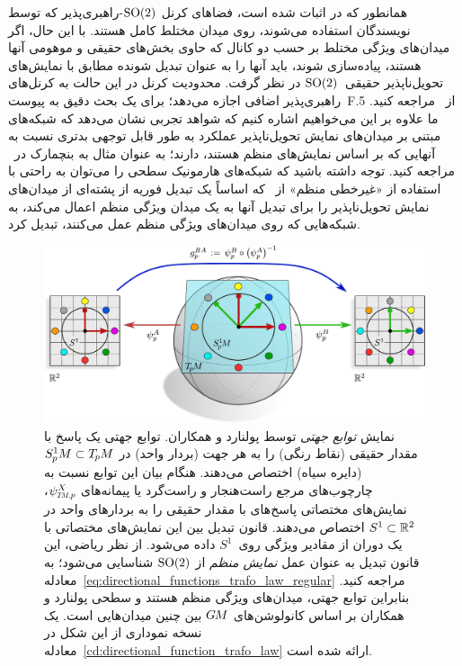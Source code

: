 همانطور که در \cite{lang2020WignerEckart,Weiler2019_E2CNN} اثبات شده است، فضاهای کرنل $\operatorname{SO}(2)$-راهبری‌پذیر که توسط نویسندگان استفاده می‌شوند، روی میدان مختلط کامل هستند.
با این حال، اگر میدان‌های ویژگی مختلط بر حسب دو کانال که حاوی بخش‌های حقیقی و موهومی آنها هستند، پیاده‌سازی شوند، باید آنها را به عنوان تبدیل شونده مطابق با نمایش‌های تحویل‌ناپذیر حقیقی~$\operatorname{SO}(2)$ در نظر گرفت.
محدودیت کرنل در این حالت به کرنل‌های راهبری‌پذیر اضافی اجازه می‌دهد؛ برای یک بحث دقیق به پیوست~F.5 از~\cite{Weiler2019_E2CNN} مراجعه کنید.
ما علاوه بر این می‌خواهیم اشاره کنیم که شواهد تجربی نشان می‌دهد که شبکه‌های مبتنی بر میدان‌های نمایش تحویل‌ناپذیر عملکرد به طور قابل توجهی بدتری نسبت به آنهایی که بر اساس نمایش‌های منظم هستند، دارند؛ به عنوان مثال به بنچمارک در~\cite{Weiler2019_E2CNN} مراجعه کنید.
توجه داشته باشید که شبکه‌های هارمونیک سطحی را می‌توان به راحتی با استفاده از «غیرخطی منظم» از~\cite{deHaan2020meshCNNs} که اساساً یک تبدیل فوریه از پشته‌ای از میدان‌های نمایش تحویل‌ناپذیر را برای تبدیل آنها به یک میدان ویژگی منظم اعمال می‌کند، به شبکه‌هایی که روی میدان‌های ویژگی منظم عمل می‌کنند، تبدیل کرد.


\begin{figure}
    \centering
    \includegraphics[width=1.\textwidth]{figures/directional_function.pdf}
    \caption{\small
        نمایش \emph{توابع جهتی} توسط پولنارد و همکاران\cite{poulenard2018multi}.
        توابع جهتی یک پاسخ با مقدار حقیقی (نقاط رنگی) را به هر جهت (بردار واحد) در $S^1_{\mkern-.5mu p}\mkern-.5muM \subset T_{\mkern-1.5mu p}\mkern-.5muM$ (دایره سیاه) اختصاص می‌دهند.
        هنگام بیان این توابع نسبت به چارچوب‌های مرجع راست‌هنجار و راست‌گرد یا پیمانه‌های $\psiTMp^X$، نمایش‌های مختصاتی پاسخ‌های با مقدار حقیقی را به بردارهای واحد در $S^1 \subset \mathbb{R}^2$ اختصاص می‌دهند.
        قانون تبدیل بین این نمایش‌های مختصاتی با یک دوران از مقادیر ویژگی روی~$S^1$ داده می‌شود.
        از نظر ریاضی، این قانون تبدیل به عنوان عمل \emph{نمایش منظم} از $\operatorname{SO}(2)$ شناسایی می‌شود؛ به معادله~\eqref{eq:directional_functions_trafo_law_regular} مراجعه کنید.
        بنابراین توابع جهتی، میدان‌های ویژگی منظم هستند و  سطحی پولنارد و همکاران\cite{poulenard2018multi} بر اساس کانولوشن‌های $G\mkern-1.4muM$ بین چنین میدان‌هایی است.
        یک نسخه نموداری از این شکل در معادله~\eqref{cd:directional_function_trafo_law} ارائه شده است.
    }
    \label{fig:directional_function}
\end{figure}



